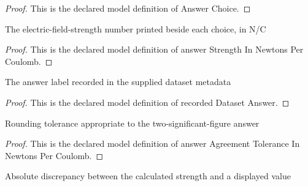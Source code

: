 \begin{proof}
  This is the declared model definition of Answer Choice.
\end{proof}
\begin{definition}
  \label{def:physics:phyx-mini-0831:phyxminiproblems-problemphyxmini0831-answerstrengthinnewtonspercoulomb}
  The electric-field-strength number printed beside each choice, in N/C
\end{definition}
\begin{proof}
  This is the declared model definition of answer Strength In Newtons Per Coulomb.
\end{proof}
\begin{definition}
  \label{def:physics:phyx-mini-0831:phyxminiproblems-problemphyxmini0831-recordeddatasetanswer}
  The answer label recorded in the supplied dataset metadata
\end{definition}
\begin{proof}
  This is the declared model definition of recorded Dataset Answer.
\end{proof}
\begin{definition}
  \label{def:physics:phyx-mini-0831:phyxminiproblems-problemphyxmini0831-answeragreementtoleranceinnewtonspercoulomb}
  Rounding tolerance appropriate to the two-significant-figure answer
\end{definition}
\begin{proof}
  This is the declared model definition of answer Agreement Tolerance In Newtons Per Coulomb.
\end{proof}
\begin{definition}
  \label{def:physics:phyx-mini-0831:phyxminiproblems-problemphyxmini0831-answerdiscrepancyinnewtonspercoulomb}
  Absolute discrepancy between the calculated strength and a displayed value
\end{definition}

